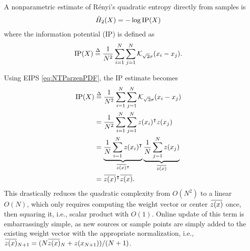 \documentclass[8pt,twocolumn]{IEEEtran}
\newcommand{\overbar}[1]{\mkern 1.5mu\overline{\mkern-1.5mu#1\mkern-1.5mu}\mkern 1.5mu}
\begin{document}
A nonparametric estimate of R\'{e}nyi's quadratic entropy directly from samples is
\begin{align}
\hat{H}_2(X)=-\log {\rm IP}(X)
\end{align}
where the information potential (IP) is defined as
\begin{align}
{\rm IP}(X)\stackrel{\Delta}{=}\frac{1}{N^2}\sum^{N}_{i=1}\sum^{N}_{j=1}\mathcal{K}_{\sqrt{2}\sigma}(x_i-x_j).
\end{align}

Using EIPS \eqref{eq:NTParzenPDF}, the IP estimate becomes
\begin{align}
{\rm IP}(X)&\stackrel{\Delta}{=}\frac{1}{N^2}\sum^{N}_{i=1}\sum^{N}_{j=1}\mathcal{K}_{\sqrt{2}\sigma}(x_i-x_j)\nonumber\\
&=\frac{1}{N^2}\sum^{N}_{i=1}\sum^{N}_{j=1}z(x_i)^\intercal z(x_j)\nonumber\\
&=\underbrace{\frac{1}{N}\sum^{N}_{i=1}z(x_i)^\intercal}_{\overbar{z(x)}^\intercal}\underbrace{\frac{1}{N}\sum^{N}_{j=1}z(x_j)}_{\overbar{z(x)}}\nonumber\\
&=\overbar{z(x)}^\intercal\overbar{z(x)}.
\end{align}
This drastically reduces the quadratic complexity from $O(N^2)$ to a linear $O(N)$, which only requires computing the weight vector or center $\overbar{z(x)}$ once, then squaring it, i.e., scalar product with $O(1)$. Online update of this term is embarrassingly simple, as new sources or sample points are simply added to the existing weight vector with the appropriate normalization, i.e., $\overbar{z(x)}_{N+1} = (N\overbar{z(x)}_{N} + z(x_{N+1}))/(N+1)$.
\end{document}

